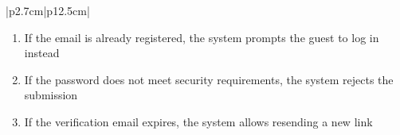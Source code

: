 \begin{table}[H]
\begin{tabular}{|p{2.7cm}|p{12.5cm}|}
\begin{minipage}[t]{\linewidth}
\begin{enumerate}[topsep=0pt,itemsep=1pt,parsep=0pt,partopsep=0pt]
                                          \item If the email is already registered, the system prompts the guest to log in
                                                instead
                                          \item If the password does not meet security requirements, the system rejects the
                                                submission
                                          \item If the verification email expires, the system allows resending a new link
                                      \end{enumerate}
                                  \end{minipage} \\
        \hline
    \end{tabular}
    \label{tab:guest-register}
\end{table}
